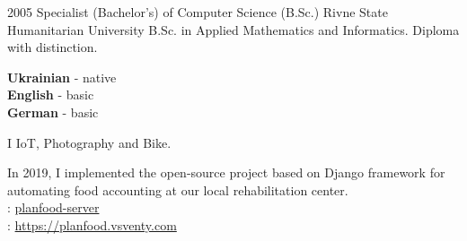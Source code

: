 \documentclass[9pt]{developercv} %
\begin{document}


\begin{entrylist}
	\entry
		{2005}
        {Specialist (Bachelor's) of Computer Science (B.Sc.)}
		{Rivne State Humanitarian University}
		{B.Sc. in Applied Mathematics and Informatics. Diploma with distinction.}
\end{entrylist}


\begin{minipage}[t]{0.3\textwidth}
	\vspace{-\baselineskip} %

	
	\textbf{Ukrainian} - native\\
	\textbf{English} - basic\\
	\textbf{German} - basic
\end{minipage}
\hfill
\begin{minipage}[t]{0.3\textwidth}
	\vspace{-\baselineskip} %
	
	
    I \textcolor{red}\faHeart{} IoT, Photography and Bike.
\end{minipage}
\hfill
\begin{minipage}[t]{0.3\textwidth}
	\vspace{-\baselineskip} %
	
	
	In 2019, I implemented the open-source project based on Django framework for automating food accounting at our local rehabilitation center.\\
    \faGithub{}: {\href{https://github.com/vsventy/planfood-server/}{planfood-server}}\\
    \faLink{}: {\href{https://planfood.vsventy.com}{https://planfood.vsventy.com}}
\end{minipage}

\end{document}
